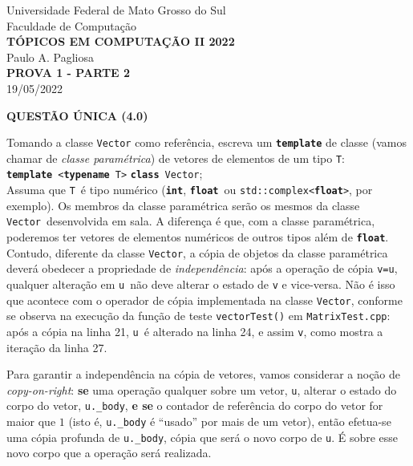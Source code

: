 \documentclass[12pt]{article}
\newcommand{\kw}[1]{{\color{myblue}\texttt{\textbf{#1}}}}
\newcommand{\sym}[1]{{\color{mygreen}\texttt{#1}}}
\newcommand{\cfile}[1]{{\color{myorange}\texttt{#1.cpp}}}
\begin{document}
\pagestyle{empty}

\begin{center}
  Universidade Federal de Mato Grosso do Sul \\
  Faculdade de Computação \\[1em]
  {\bf\large TÓPICOS EM COMPUTAÇÃO II 2022} \\
  Paulo A. Pagliosa \\[1em]
  {\bf PROVA 1 - PARTE 2} \\
  19/05/2022
\end{center}

\vspace{5mm}
\noindent
{\bf QUESTÃO ÚNICA (4.0)}

\noindent
Tomando a classe \sym{Vector} como referência, escreva um \kw{template} de classe (vamos chamar de \emph{classe paramétrica}) de vetores de elementos de um tipo \sym{T}:\\[1.5ex]
\kw{template}\ \texttt{<}\kw{typename}\ \sym{T}\texttt{>} \kw{class}\ \sym{Vector};\\[1.5ex]
Assuma que \sym{T}\ é tipo numérico (\kw{int}, \kw{float}\ ou \texttt{std::}\sym{complex}\texttt{<}\kw{float}\texttt{>}, por exemplo). Os membros da classe paramétrica serão os mesmos da classe \sym{Vector}\ desenvolvida em sala. A diferença é que, com a classe paramétrica, poderemos ter vetores de elementos numéricos de outros tipos além de \kw{float}. Contudo, diferente da classe \sym{Vector}, a cópia de objetos da classe paramétrica deverá obedecer a propriedade de \emph{independência}: após a operação de cópia \sym{v}\texttt{=}\sym{u}, qualquer alteração em \sym{u}\ não deve alterar o estado de \sym{v} e vice-versa. Não é isso que acontece com o operador de cópia implementada na classe \sym{Vector}, conforme se observa na execução da função de teste \texttt{vectorTest()} em \cfile{MatrixTest}: após a cópia na linha 21, \sym{u}\ é alterado na linha 24, e assim \sym{v}, como mostra a iteração da linha 27.

Para garantir a independência na cópia de vetores, vamos considerar a noção de \emph{copy-on-right}: \textbf{se} uma operação qualquer sobre um vetor, \sym{u}, alterar o estado do corpo do vetor, \sym{u}\texttt{.}\sym{\_body}, \textbf{e se} o contador de referência do corpo do vetor for maior que $1$ (isto é, \sym{u}\texttt{.}\sym{\_body} é ``usado'' por mais de um vetor), então efetua-se uma cópia profunda de \sym{u}\texttt{.}\sym{\_body}, cópia que será o novo corpo de \sym{u}. É sobre esse novo corpo que a operação será realizada.
\end{document}
